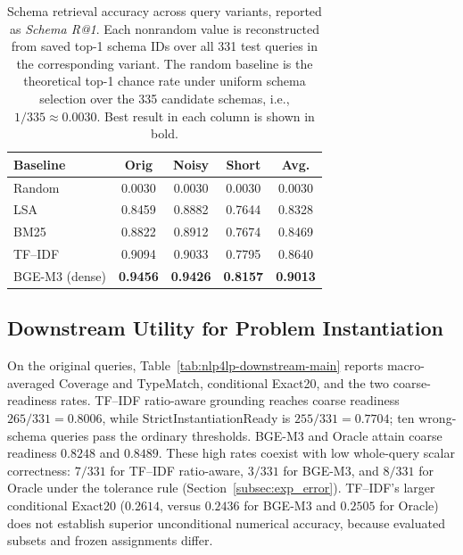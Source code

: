 \documentclass[pdflatex,sn-basic,Numbered]{sn-jnl}
\begin{document}
\begin{table}[t]
  \centering
  \caption{Schema retrieval accuracy across query variants, reported as \textit{Schema R@1}. Each nonrandom value is reconstructed from saved top-1 schema IDs over all 331 test queries in the corresponding variant. The random baseline is the theoretical top-1 chance rate under uniform schema selection over the 335 candidate schemas, i.e., $1/335 \approx 0.0030$. Best result in each column is shown in bold.}
  \label{tab:nlp4lp-retrieval-main}
  \small
  \begin{tabular}{lcccc}
    \toprule
    Baseline & Orig & Noisy & Short & Avg. \\
    \midrule
    Random  & 0.0030 & 0.0030 & 0.0030 & 0.0030 \\
    LSA     & 0.8459 & 0.8882 & 0.7644 & 0.8328 \\
    BM25    & 0.8822 & 0.8912 & 0.7674 & 0.8469 \\
    TF--IDF & 0.9094 & 0.9033 & 0.7795 & 0.8640 \\
    BGE-M3 (dense) & \textbf{0.9456} & \textbf{0.9426} & \textbf{0.8157} & \textbf{0.9013} \\
    \bottomrule
  \end{tabular}
\end{table}

\subsection{Downstream Utility for Problem Instantiation}
\label{subsec:exp_downstream}

On the original queries, Table~\ref{tab:nlp4lp-downstream-main} reports macro-averaged Coverage and TypeMatch, conditional Exact20, and the two coarse-readiness rates. TF--IDF ratio-aware grounding reaches coarse readiness $265/331=0.8006$, while StrictInstantiationReady is $255/331=0.7704$; ten wrong-schema queries pass the ordinary thresholds. BGE-M3 and Oracle attain coarse readiness $0.8248$ and $0.8489$. These high rates coexist with low whole-query scalar correctness: $7/331$ for TF--IDF ratio-aware, $3/331$ for BGE-M3, and $8/331$ for Oracle under the tolerance rule (Section~\ref{subsec:exp_error}). TF--IDF's larger conditional Exact20 ($0.2614$, versus $0.2436$ for BGE-M3 and $0.2505$ for Oracle) does not establish superior unconditional numerical accuracy, because evaluated subsets and frozen assignments differ.
\end{document}
